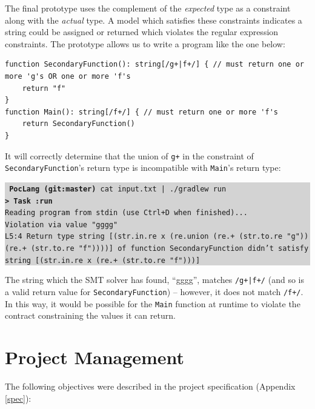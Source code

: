 \documentclass[a4paper]{article}
\newcommand{\termbox}[1] {\colorbox{lightgrey}{\parbox{\textwidth}{\vspace{.75\baselineskip}\centering\parbox{0.95\textwidth}{ \sffamily#1\vspace{.75\baselineskip}}}}}
\begin{document}
The final prototype uses the complement of the \emph{expected} type as a constraint along with the \emph{actual} type. A model which satisfies these constraints indicates a string could be assigned or returned which violates the regular expression constraints. The prototype allows us to write a program like the one below:

\begin{verbatim}
function SecondaryFunction(): string[/g+|f+/] { // must return one or more 'g's OR one or more 'f's
    return "f"
}
function Main(): string[/f+/] { // must return one or more 'f's
    return SecondaryFunction()
}
\end{verbatim}

It will correctly determine that the union of \texttt{g+} in the constraint of \texttt{SecondaryFunction}'s return type is incompatible with \texttt{Main}'s return type:

\termbox{
    \texttt{\textcolor{term-green}{} \ttfamily \textbf{\textcolor{term-dir}{PocLang} \textcolor{term-git}{(git:}\textcolor{term-branch}{master}\textcolor{term-git}{)}} cat input.txt | ./gradlew run}\\
    \texttt{\textbf{> Task :run}}\\
    \textcolor{term-green}{\texttt{Reading program from stdin (use Ctrl+D when finished)...}}\\
    \textcolor{id7-ruby-red}{\texttt{Violation via value "gggg"}}\\
    \textcolor{id7-ruby-red}{\texttt{L5:4 Return type string [(str.in.re x (re.union (re.+ (str.to.re "g")) (re.+ (str.to.re "f"))))] of function SecondaryFunction didn't satisfy string [(str.in.re x (re.+ (str.to.re "f")))]}}
}

The string which the SMT solver has found, ``gggg'', matches \texttt{/g+|f+/} (and so is a valid return value for \texttt{SecondaryFunction}) -- however, it does not match \texttt{/f+/}. In this way, it would be possible for the \texttt{Main} function at runtime to violate the contract constraining the values it can return.


\section{Project Management}

The following objectives were described in the project specification (Appendix \ref{spec}):
\end{document}
